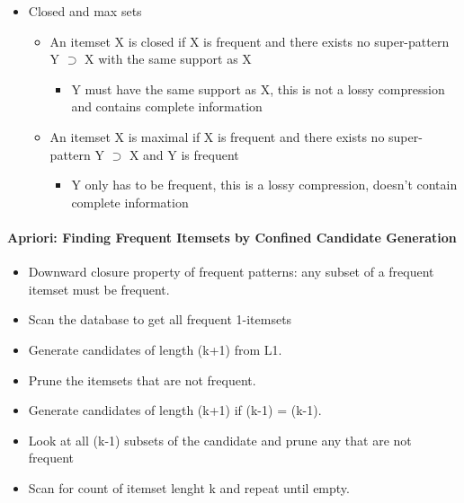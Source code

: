 \documentclass[11pt]{article}
\providecommand{\tightlist}{%
      \setlength{\itemsep}{0pt}\setlength{\parskip}{0pt}}
\begin{document}
    \begin{itemize}
\tightlist
\item
  Closed and max sets

  \begin{itemize}
  \tightlist
  \item
    An itemset X is closed if X is frequent and there exists no
    super-pattern Y \(\supset\) X with the same support as X

    \begin{itemize}
    \tightlist
    \item
      Y must have the same support as X, this is not a lossy compression
      and contains complete information
    \end{itemize}
  \item
    An itemset X is maximal if X is frequent and there exists no
    super-pattern Y \(\supset\) X and Y is frequent

    \begin{itemize}
    \tightlist
    \item
      Y only has to be frequent, this is a lossy compression, doesn't
      contain complete information
    \end{itemize}
  \end{itemize}
\end{itemize}

    \paragraph{Apriori: Finding Frequent Itemsets by Confined Candidate
Generation}\label{apriori-finding-frequent-itemsets-by-confined-candidate-generation}

    \begin{itemize}
\tightlist
\item
  Downward closure property of frequent patterns: any subset of a
  frequent itemset must be frequent.
\item
  Scan the database to get all frequent 1-itemsets
\item
  Generate candidates of length (k+1) from L1.
\item
  Prune the itemsets that are not frequent.
\item
  Generate candidates of length (k+1) if (k-1) = (k-1).
\item
  Look at all (k-1) subsets of the candidate and prune any that are not
  frequent
\item
  Scan for count of itemset lenght k and repeat until empty.
\end{itemize}
\end{document}
